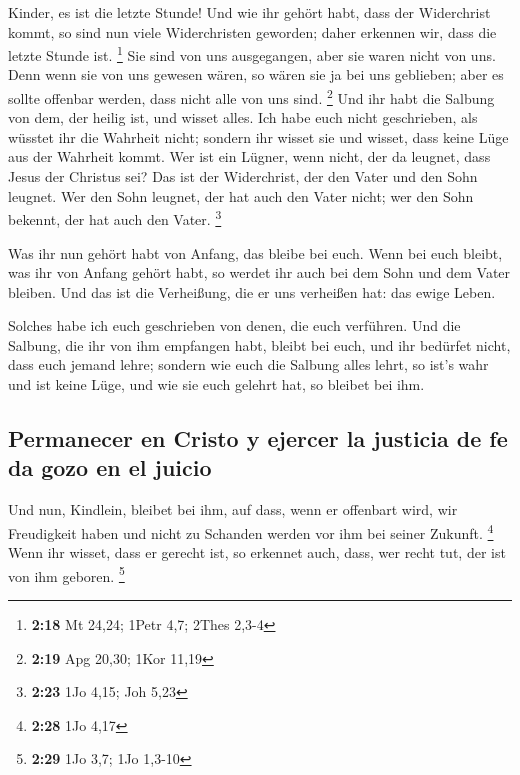  Kinder, es ist die letzte Stunde! Und wie ihr gehört
habt, dass der Widerchrist kommt, so sind nun viele Widerchristen
geworden; daher erkennen wir, dass die letzte Stunde ist. \footnote{\textbf{2:18}
  Mt 24,24; 1Petr 4,7; 2Thes 2,3-4}  Sie sind von uns
ausgegangen, aber sie waren nicht von uns. Denn wenn sie von uns gewesen
wären, so wären sie ja bei uns geblieben; aber es sollte offenbar
werden, dass nicht alle von uns sind. \footnote{\textbf{2:19} Apg 20,30;
  1Kor 11,19}  Und ihr habt die Salbung von dem, der
heilig ist, und wisset alles.  Ich habe euch nicht
geschrieben, als wüsstet ihr die Wahrheit nicht; sondern ihr wisset sie
und wisset, dass keine Lüge aus der Wahrheit kommt.  Wer
ist ein Lügner, wenn nicht, der da leugnet, dass Jesus der Christus sei?
Das ist der Widerchrist, der den Vater und den Sohn leugnet.
 Wer den Sohn leugnet, der hat auch den Vater nicht; wer
den Sohn bekennt, der hat auch den Vater. \footnote{\textbf{2:23} 1Jo
  4,15; Joh 5,23}

 Was ihr nun gehört habt von Anfang, das bleibe bei euch.
Wenn bei euch bleibt, was ihr von Anfang gehört habt, so werdet ihr auch
bei dem Sohn und dem Vater bleiben.  Und das ist die
Verheißung, die er uns verheißen hat: das ewige Leben.

 Solches habe ich euch geschrieben von denen, die euch
verführen.  Und die Salbung, die ihr von ihm empfangen
habt, bleibt bei euch, und ihr bedürfet nicht, dass euch jemand lehre;
sondern wie euch die Salbung alles lehrt, so ist's wahr und ist keine
Lüge, und wie sie euch gelehrt hat, so bleibet bei ihm.

\hypertarget{permanecer-en-cristo-y-ejercer-la-justicia-de-fe-da-gozo-en-el-juicio}{%
\subsection{Permanecer en Cristo y ejercer la justicia de fe da gozo en
el
juicio}\label{permanecer-en-cristo-y-ejercer-la-justicia-de-fe-da-gozo-en-el-juicio}}

 Und nun, Kindlein, bleibet bei ihm, auf dass, wenn er
offenbart wird, wir Freudigkeit haben und nicht zu Schanden werden vor
ihm bei seiner Zukunft. \footnote{\textbf{2:28} 1Jo 4,17}
 Wenn ihr wisset, dass er gerecht ist, so erkennet auch,
dass, wer recht tut, der ist von ihm geboren. \footnote{\textbf{2:29}
  1Jo 3,7; 1Jo 1,3-10}

